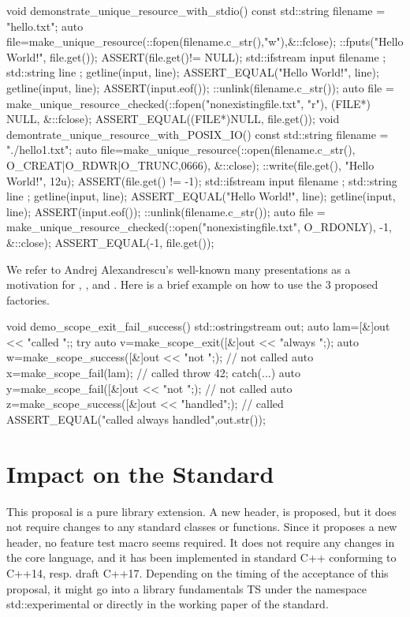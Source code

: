 \documentclass[ebook,11pt,article]{memoir}
\begin{document}
\begin{codeblock}
void demonstrate_unique_resource_with_stdio() {
  const std::string filename = "hello.txt";
  { auto file=make_unique_resource(::fopen(filename.c_str(),"w"),&::fclose);
    ::fputs("Hello World!\n", file.get());
    ASSERT(file.get()!= NULL);
  }
  { std::ifstream input { filename };
    std::string line { };
    getline(input, line);
    ASSERT_EQUAL("Hello World!", line);
    getline(input, line);
    ASSERT(input.eof());
  }
  ::unlink(filename.c_str());
  {
    auto file = make_unique_resource_checked(::fopen("nonexistingfile.txt", "r"), 
                (FILE*) NULL, &::fclose);
    ASSERT_EQUAL((FILE*)NULL, file.get());
  }
}
void demontrate_unique_resource_with_POSIX_IO() {
  const std::string filename = "./hello1.txt";
  { auto file=make_unique_resource(::open(filename.c_str(),
                     O_CREAT|O_RDWR|O_TRUNC,0666), &::close);
    ::write(file.get(), "Hello World!\n", 12u);
    ASSERT(file.get() != -1);
  }
  { std::ifstream input { filename };
    std::string line { };
    getline(input, line);
    ASSERT_EQUAL("Hello World!", line);
    getline(input, line);
    ASSERT(input.eof());
  }
  ::unlink(filename.c_str());
  {
    auto file = make_unique_resource_checked(::open("nonexistingfile.txt", 
                       O_RDONLY), -1, &::close);
    ASSERT_EQUAL(-1, file.get());
  }
}\end{codeblock}

We refer to Andrej Alexandrescu's well-known many presentations as a motivation for , , and . Here is a brief example on how to use the 3 proposed factories. 
\begin{codeblock}
void demo_scope_exit_fail_success(){
  std::ostringstream out{};
  auto lam=[&]{out << "called ";};
  try{
    auto v=make_scope_exit([&]{out << "always ";});
    auto w=make_scope_success([&]{out << "not ";}); // not called
    auto x=make_scope_fail(lam); // called
    throw 42;
  }catch(...){
    auto y=make_scope_fail([&]{out << "not ";}); // not called
    auto z=make_scope_success([&]{out << "handled";}); // called
  }
  ASSERT_EQUAL("called always handled",out.str());
}
\end{codeblock}


\chapter{Impact on the Standard}
This proposal is a pure library extension. A new header,  is proposed, but it does not require changes to any standard classes or functions. Since it proposes a new header, no feature test macro seems required. It does not require any changes in the core language, and it has been implemented in standard C++ conforming to C++14, resp. draft C++17. Depending on the timing of the acceptance of this proposal, it might go into a library fundamentals TS under the namespace std::experimental or directly in the working paper of the standard.
\end{document}
